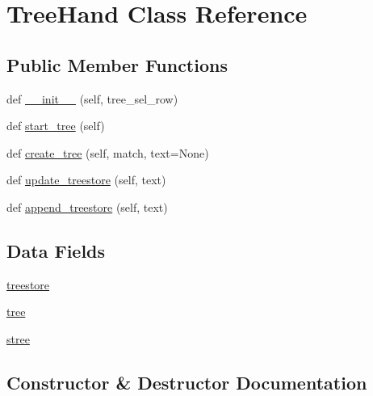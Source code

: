 \hypertarget{classtreehand_1_1_tree_hand}{}\section{Tree\+Hand Class Reference}
\label{classtreehand_1_1_tree_hand}
\subsection*{Public Member Functions}
\begin{DoxyCompactItemize}
\item 
def \hyperlink{classtreehand_1_1_tree_hand_aabaa7e33eed1ddc64a302cedbc99b421}{\+\_\+\+\_\+init\+\_\+\+\_\+} (self, tree\+\_\+sel\+\_\+row)
\item 
def \hyperlink{classtreehand_1_1_tree_hand_a0b8b6c3225e291dcb9b9ce13d6292b2a}{start\+\_\+tree} (self)
\item 
def \hyperlink{classtreehand_1_1_tree_hand_a916011b9ffb69624d31665f8cd2c494d}{create\+\_\+tree} (self, match, text=None)
\item 
def \hyperlink{classtreehand_1_1_tree_hand_a7fc3506055afa66f0a11d5e5445b8729}{update\+\_\+treestore} (self, text)
\item 
def \hyperlink{classtreehand_1_1_tree_hand_a54f38a035dfb7d513590e21e097aafc6}{append\+\_\+treestore} (self, text)
\end{DoxyCompactItemize}
\subsection*{Data Fields}
\begin{DoxyCompactItemize}
\item 
\hyperlink{classtreehand_1_1_tree_hand_a555b9539fb020fe8fb52e7c61eceda72}{treestore}
\item 
\hyperlink{classtreehand_1_1_tree_hand_a76dbcfc78e812394f40977b0e13a3a47}{tree}
\item 
\hyperlink{classtreehand_1_1_tree_hand_ac25c0ac677bf2b00e27bd937730b0964}{stree}
\end{DoxyCompactItemize}


\subsection{Constructor \& Destructor Documentation}
\mbox{\label{classtreehand_1_1_tree_hand_aabaa7e33eed1ddc64a302cedbc99b421}} 
